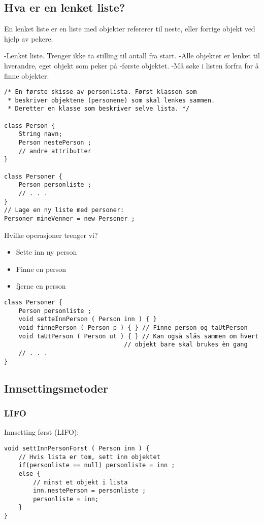 \documentclass[11pt]{article}
\begin{document}
\subsection{Hva er en lenket liste?}
\label{sec-8-1}

En lenket liste er en liste med objekter refererer til neste, eller forrige objekt ved hjelp av pekere.

-Lenket liste. Trenger ikke ta stilling til antall fra start.
-Alle objekter er lenket til hverandre, eget objekt som peker på
-første objektet.
-Må søke i listen forfra for å finne objekter.



\begin{verbatim}
/* En første skisse av personlista. Først klassen som
 * beskriver objektene (personene) som skal lenkes sammen.
 * Deretter en klasse som beskriver selve lista. */

class Person {
    String navn;
    Person nestePerson ;
    // andre attributter
}

class Personer {
    Person personliste ;
    // . . .
}
// Lage en ny liste med personer:
Personer mineVenner = new Personer ;
\end{verbatim}

Hvilke operasjoner trenger vi?
\begin{itemize}
\item Sette inn ny person
\item Finne en person
\item fjerne en person
\end{itemize}


\begin{verbatim}
class Personer {
    Person personliste ;
    void setteInnPerson ( Person inn ) { }
    void finnePerson ( Person p ) { } // Finne person og taUtPerson
    void taUtPerson ( Person ut ) { } // Kan også slås sammen om hvert 
                                 // objekt bare skal brukes èn gang
    // . . .
}
\end{verbatim}
\subsection{Innsettingsmetoder}
\label{sec-8-2}
\subsubsection{LIFO}
\label{sec-8-2-1}

Innsetting først (LIFO):


\begin{verbatim}
void settInnPersonForst ( Person inn ) {
    // Hvis lista er tom, sett inn objektet
    if(personliste == null) personliste = inn ;
    else {
        // minst et objekt i lista
        inn.nestePerson = personliste ;
        personliste = inn;
    }
}
\end{verbatim}
\end{document}
